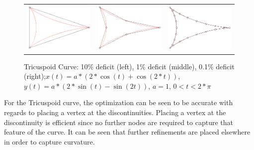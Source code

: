 \begin{figure}[h!]
  \centering
  \begin{tabular}{ccc}
  \includegraphics[width=0.3\linewidth]{Figures/tricuspoid01.png} &
  \includegraphics[width=0.3\linewidth]{Figures/tricuspoid001.png} &
  \includegraphics[width=0.3\linewidth]{Figures/tricuspoid0001.png}
  \end{tabular}
  \caption{\label{fig:tricuspoid} Tricuspoid Curve: 10\% deficit (left), 
1\% deficit (middle), 0.1\% deficit (right);\newline $x(t) = a*(2*\cos(t) 
+ \cos(2*t))$, $y(t) = a*(2*\sin(t) - \sin(2t))$, $a=1$, $0<t<2*\pi$}
\end{figure}

For the Tricuspoid curve, the optimization can be seen to be accurate with regards to placing a vertex at the discontinuities. Placing a vertex at the discontinuity is efficient since no further nodes are required to capture that feature of the curve. It can be seen that further refinements are placed elsewhere in order to capture curvature.

